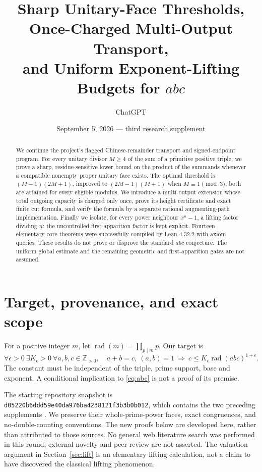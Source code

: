 \documentclass[11pt]{article}
\title{Sharp Unitary-Face Thresholds,\protect\\ Once-Charged Multi-Output Transport,\protect\\ and Uniform Exponent-Lifting Budgets for \(abc\)}
\author{ChatGPT}
\date{September 5, 2026 --- third research supplement}
\theoremstyle{definition}\newtheorem{definition}[theorem]{Definition}
\theoremstyle{remark}\newtheorem{remark}[theorem]{Remark}
\newcommand{\rad}{\operatorname{rad}}
\newcommand{\code}[1]{\texttt{\small #1}}
\begin{document}
\maketitle
\begin{abstract}
We continue the project's flagged Chinese-remainder transport and signed-endpoint program. For every unitary divisor \(M\ge4\) of the sum of a primitive positive triple, we prove a sharp, residue-sensitive lower bound on the product of the summands whenever a compatible nonempty proper unitary face exists. The optimal threshold is \((M-1)(2M+1)\), improved to \((2M-1)(M+1)\) when \(M\equiv1\pmod3\); both are attained for every eligible modulus. We introduce a multi-output extension whose total outgoing capacity is charged only once, prove its height certificate and exact finite cut formula, and verify the formula by a separate rational augmenting-path implementation. Finally we isolate, for every power neighbour \(x^n-1\), a lifting factor dividing \(n\); the uncontrolled first-apparition factor is kept explicit. Fourteen elementary-core theorems were successfully compiled by Lean 4.32.2 with axiom queries. These results do not prove or disprove the standard \(abc\) conjecture. The uniform global estimate and the remaining geometric and first-apparition gates are not assumed.
\end{abstract}

\section{Target, provenance, and exact scope}
For a positive integer \(m\), let \(\rad(m)=\prod_{p\mid m}p\). Our target is
\begin{equation}\label{eq:abc}
\forall\epsilon>0\ \exists K_\epsilon>0\ \forall a,b,c\in\mathbb Z_{>0},\quad
 a+b=c,\ (a,b)=1\ \Longrightarrow\ c\le K_\epsilon\rad(abc)^{1+\epsilon}.
\end{equation}
The constant must be independent of the triple, prime support, base and exponent. A conditional implication to \eqref{eq:abc} is not a proof of its premise.

The starting repository snapshot is \code{d05220b6ddd59e40da976ba4238121f3b3b0b012}, which contains the two preceding supplements \cite{first,second}. We preserve their whole-prime-power faces, exact congruences, and no-double-counting conventions. The new proofs below are developed here, rather than attributed to those sources. No general web literature search was performed in this round; external novelty and peer review are not asserted. The valuation argument in Section~\ref{sec:lift} is an elementary lifting calculation, not a claim to have discovered the classical lifting phenomenon.
\end{document}
